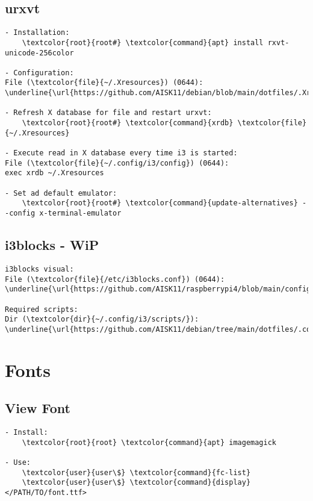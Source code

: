 \documentclass[10pt, a4paper, onecolumn, openany]{book} %
\begin{document}
\subsection{urxvt}
\begin{Verbatim}[commandchars=\\\{\}]
- Installation:
    \textcolor{root}{root#} \textcolor{command}{apt} install rxvt-unicode-256color

- Configuration:
File (\textcolor{file}{~/.Xresources}) (0644):
\underline{\url{https://github.com/AISK11/debian/blob/main/dotfiles/.Xresources}}

- Refresh X database for file and restart urxvt:
    \textcolor{root}{root#} \textcolor{command}{xrdb} \textcolor{file}{~/.Xresources}
    
- Execute read in X database every time i3 is started:
File (\textcolor{file}{~/.config/i3/config}) (0644):
exec xrdb ~/.Xresources

- Set ad default emulator:
    \textcolor{root}{root#} \textcolor{command}{update-alternatives} --config x-terminal-emulator
\end{Verbatim}


\subsection{i3blocks - WiP}
\begin{Verbatim}[commandchars=\\\{\}]
i3blocks visual:
File (\textcolor{file}{/etc/i3blocks.conf}) (0644):
\underline{\url{https://github.com/AISK11/raspberrypi4/blob/main/config_files/i3blocks.conf}}

Required scripts:
Dir (\textcolor{dir}{~/.config/i3/scripts/}):
\underline{\url{https://github.com/AISK11/debian/tree/main/dotfiles/.config/i3/scripts}}
\end{Verbatim}

\section{Fonts}
\subsection{View Font}
\begin{Verbatim}[commandchars=\\\{\}]
- Install:
    \textcolor{root}{root} \textcolor{command}{apt} imagemagick
    
- Use:
    \textcolor{user}{user\$} \textcolor{command}{fc-list} 
    \textcolor{user}{user\$} \textcolor{command}{display} </PATH/TO/font.ttf>
\end{Verbatim}
\end{document}
